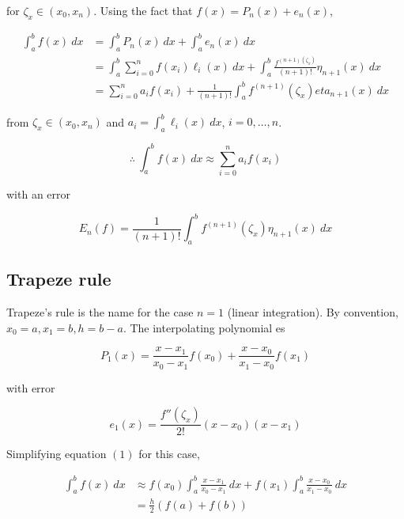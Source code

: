 \documentclass[12pt]{article}
\theoremstyle{definition}
\begin{document}
for $\zeta_x \in (x_0, x_n)$. Using the fact that $f(x) = P_n(x) + e_n(x)$,

\begin{align*}
    \int_a^b f(x) ~ dx 
    &= \int_a^b P_n(x) ~ dx + \int_a^b e_n(x) ~ dx \\ 
    &= \int_a^b \sum_{i=0}^n f(x_i) \ell_i(x) ~ dx + \int_a^b
    \frac{f^{(n+1)(\zeta_x)}}{(n+1)!} \eta_{n+1}(x) ~ dx \\ 
    &= \sum_{i=0}^n a_i f(x_i) + \frac{1}{(n+1)!}\int_a^b f^{(n+1)}(\zeta_x)
    eta_{n+1}(x) ~ dx
\end{align*}

from $\zeta_x \in (x_0, x_n)$ and $a_i = \int_a^b \ell_i(x) ~ dx$, $i = 0,
\ldots, n$.

\begin{equation}
    \therefore ~ \int_a^b f(x) ~ dx \approx \sum_{i=0}^n a_i f(x_i)
\end{equation}

with an error 

\begin{equation}
    E_n(f) = \frac{1}{(n+1)!}\int_a^b f^{(n+1)}(\zeta_x) \eta_{n+1}(x) ~ dx
\end{equation}

\subsection{Trapeze rule}

Trapeze's rule is the name for the case $n = 1$ (linear integration). By
convention, $x_0 = a, x_1 = b, h = b- a$. The interpolating polynomial es 

\begin{equation*}
    P_1(x) = \frac{x-x_1}{x_0 - x_1} f(x_0) + \frac{x-x_0}{x_1 - x_0} f(x_1)
\end{equation*}

with error 

\begin{equation*}
    e_1(x) = \frac{f''(\zeta_x)}{2!}(x-x_0)(x-x_1)
\end{equation*}

Simplifying equation $(1)$ for this case, 

\begin{align*}
    \int_a^b f(x) ~ dx &\approx f(x_0)\int_a^b \frac{x-x_1}{x_0 - x_1} ~ dx +
    f(x_1) \int_a^b \frac{x-x_0}{x_1 - x_0} ~ dx \\ 
    &= \frac{h}{2}\left( f(a) + f(b) \right) 
\end{align*}
\end{document}
